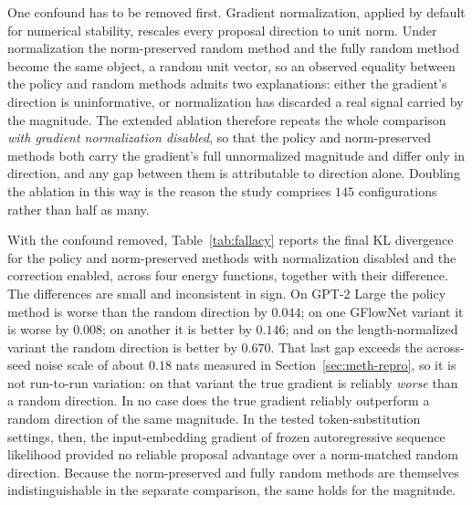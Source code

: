 One confound has to be removed first. Gradient normalization, applied by default for numerical stability, rescales every proposal direction to unit norm. Under normalization the norm-preserved random method and the fully random method become the same object, a random unit vector, so an observed equality between the policy and random methods admits two explanations: either the gradient's direction is uninformative, or normalization has discarded a real signal carried by the magnitude. The extended ablation therefore repeats the whole comparison \emph{with gradient normalization disabled}, so that the policy and norm-preserved methods both carry the gradient's full unnormalized magnitude and differ only in direction, and any gap between them is attributable to direction alone. Doubling the ablation in this way is the reason the study comprises $145$ configurations rather than half as many.

With the confound removed, Table~\ref{tab:fallacy} reports the final KL divergence for the policy and norm-preserved methods with normalization disabled and the correction enabled, across four energy functions, together with their difference.
The differences are small and inconsistent in sign. On GPT-2 Large the policy method is worse than the random direction by $0.044$; on one GFlowNet variant it is worse by $0.008$; on another it is better by $0.146$; and on the length-normalized variant the random direction is better by $0.670$. That last gap exceeds the across-seed noise scale of about $0.18$ nats measured in Section~\ref{sec:meth-repro}, so it is not run-to-run variation: on that variant the true gradient is reliably \emph{worse} than a random direction. In no case does the true gradient reliably outperform a random direction of the same magnitude. In the tested token-substitution settings, then, the input-embedding gradient of frozen autoregressive sequence likelihood provided no reliable proposal advantage over a norm-matched random direction. Because the norm-preserved and fully random methods are themselves indistinguishable in the separate comparison, the same holds for the magnitude.

